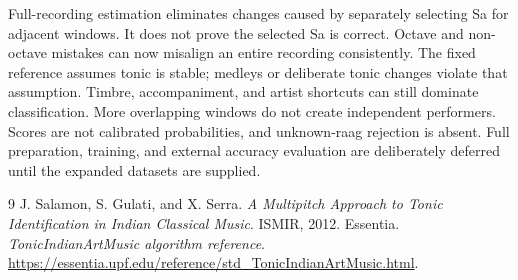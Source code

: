 \documentclass[11pt,a4paper]{article}
\begin{document}
Full-recording estimation eliminates changes caused by separately selecting Sa
for adjacent windows. It does not prove the selected Sa is correct. Octave and
non-octave mistakes can now misalign an entire recording consistently. The fixed
reference assumes tonic is stable; medleys or deliberate tonic changes violate
that assumption. Timbre, accompaniment, and artist shortcuts can still dominate
classification. More overlapping windows do not create independent performers.
Scores are not calibrated probabilities, and unknown-raag rejection is absent.
Full preparation, training, and external accuracy evaluation are deliberately
deferred until the expanded datasets are supplied.

\begin{thebibliography}{9}
 J. Salamon, S. Gulati, and X. Serra.
\emph{A Multipitch Approach to Tonic Identification in Indian Classical Music}.
ISMIR, 2012.
 Essentia. \emph{TonicIndianArtMusic algorithm reference}.
\url{https://essentia.upf.edu/reference/std_TonicIndianArtMusic.html}.
\end{thebibliography}
\end{document}
